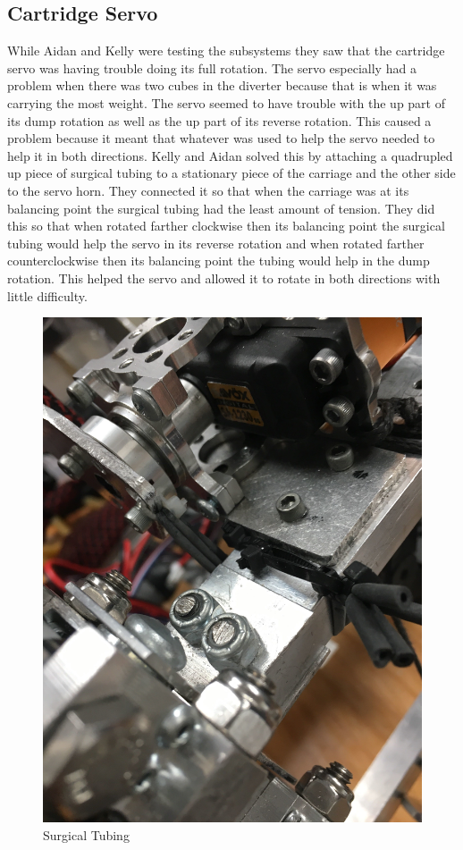 \documentclass{article}
\begin{document}
\subsection{Cartridge Servo}
While Aidan and Kelly were testing the subsystems they saw that the cartridge servo was having trouble doing its full rotation. The servo especially had a problem when there was two cubes in the diverter because that is when it was carrying the most weight. The servo seemed to have trouble with the up part of its dump rotation as well as the up part of its reverse rotation. This caused a problem because it meant that whatever was used to help the servo needed to help it in both directions. Kelly and Aidan solved this by attaching a quadrupled up piece of surgical tubing to a stationary piece of the carriage and the other side to the servo horn. They connected it so that when the carriage was at its balancing point the surgical tubing had the least amount of tension. They did this so that when rotated farther clockwise then its balancing point the surgical tubing would help the servo in its reverse rotation and when rotated farther counterclockwise then its balancing point the tubing would help in the dump rotation. This helped the servo and allowed it to rotate in both directions with little difficulty.

\begin{figure}
    \centering
    \includegraphics[width=.6 \textwidth]{21_01-21/images/tubing.JPG}
    \caption{Surgical Tubing}
    \label{fig:tubing}
\end{figure}
\end{document}
